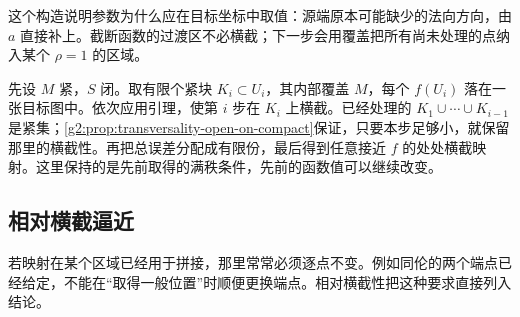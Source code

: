 这个构造说明参数为什么应在目标坐标中取值：源端原本可能缺少的法向方向，由 \(a\) 直接补上。截断函数的过渡区不必横截；下一步会用覆盖把所有尚未处理的点纳入某个 \(\rho=1\) 的区域。

\ProseParagraphBreak

先设 \(M\) 紧，\(S\) 闭。取有限个紧块 \(K_i\subset U_i\)，其内部覆盖 \(M\)，每个 \(f(U_i)\) 落在一张目标图中。依次应用引理，使第 \(i\) 步在 \(K_i\) 上横截。已经处理的 \(K_1\cup\cdots\cup K_{i-1}\) 是紧集；\cref{g2:prop:transversality-open-on-compact}保证，只要本步足够小，就保留那里的横截性。再把总误差分配成有限份，最后得到任意接近 \(f\) 的处处横截映射。这里保持的是先前取得的满秩条件，先前的函数值可以继续改变。

\subsection{相对横截逼近}
\label{g2:subsec:1404:02}

若映射在某个区域已经用于拼接，那里常常必须逐点不变。例如同伦的两个端点已经给定，不能在“取得一般位置”时顺便更换端点。相对横截性把这种要求直接列入结论。

